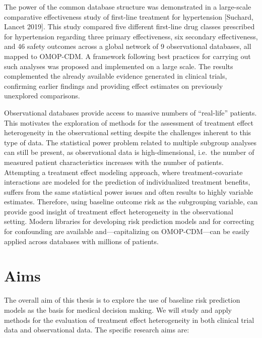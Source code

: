\documentclass[
]{book}
\begin{document}
The power of the common database structure was demonstrated in a large-scale
comparative effectiveness study of first-line treatment for hypertension
{[}Suchard, Lancet 2019{]}. This study compared five different first-line drug
classes prescribed for hypertension regarding three primary effectiveness, six
secondary effectiveness, and 46 safety outcomes across a global network of 9
observational databases, all mapped to OMOP-CDM. A framework following best
practices for carrying out such analyses was proposed and implemented on a large
scale. The results complemented the already available evidence generated in
clinical trials, confirming earlier findings and providing effect estimates on
previously unexplored comparisons.

Observational databases provide access to massive numbers of ``real-life''
patients. This motivates the exploration of methods for the assessment of
treatment effect heterogeneity in the observational setting despite the
challenges inherent to this type of data. The statistical power problem related
to multiple subgroup analyses can still be present, as observational data is
high-dimensional, i.e.~the number of measured patient characteristics increases
with the number of patients. Attempting a treatment effect modeling approach,
where treatment-covariate interactions are modeled for the prediction of
individualized treatment benefits, suffers from the same statistical power
issues and often results to highly variable estimates. Therefore, using baseline
outcome risk as the subgrouping variable, can provide good insight of treatment
effect heterogeneity in the observational setting. Modern libraries for
developing risk prediction models and for correcting for confounding are
available and---capitalizing on OMOP-CDM---can be easily applied across
databases with millions of patients.

\hypertarget{aims}{%
\section{Aims}\label{aims}}

The overall aim of this thesis is to explore the use of baseline risk prediction
models as the basis for medical decision making. We will study and apply methods
for the evaluation of treatment effect heterogeneity in both clinical trial data
and observational data. The specific research aims are:
\end{document}
